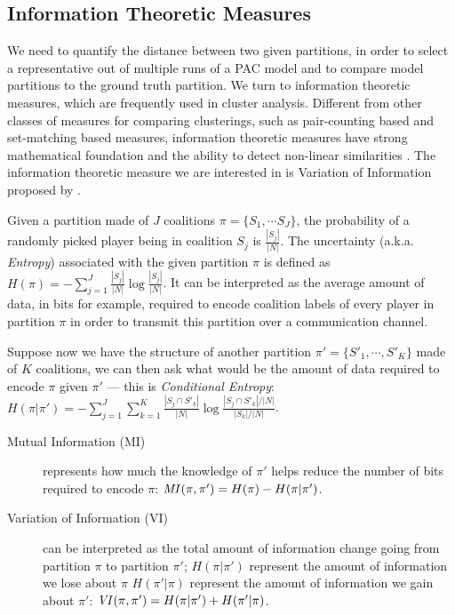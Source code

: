 \subsection{Information Theoretic Measures}
\label{subsec:information_theoretic_measures}

We need to quantify the distance between two given partitions, in order
to select a representative out of multiple runs of a PAC model and to compare
model partitions to the ground truth partition.
We turn to information theoretic measures, which are frequently used in cluster
analysis.
Different from other classes of measures for comparing clusterings, such as
pair-counting based and set-matching based measures, information theoretic
measures have strong mathematical foundation and the ability to detect
non-linear similarities \cite{Vinh:2010:ITM:1756006.1953024}.
The information theoretic measure we are interested in is Variation of
Information proposed by .

Given a partition made of $J$ coalitions $\pi = \{S_1, \cdots S_J\}$, the
probability of a randomly picked player being in coalition $S_j$ is
$\frac{|S_j|}{|N|}$.
The uncertainty (a.k.a. \textit{Entropy}) associated with the given partition
$\pi$ is defined as
$H(\pi) = - \sum^J_{j=1} \frac{|S_j|}{|N|} \log{\frac{|S_j|}{|N|}}$.
It can be interpreted as the average amount of data, in bits for example,
required to encode coalition labels of every player in partition $\pi$ in order
to transmit this partition over a communication channel.

Suppose now we have the structure of another partition
$\pi' = \{S'_1, \cdots, S'_K\}$ made of $K$ coalitions, we can then ask what
would be the amount of data required to encode $\pi$ given $\pi'$
--- this is \textit{Conditional Entropy}:
$H(\pi|\pi') = - \sum^J_{j=1} \sum^K_{k=1} \frac{|S_j \cap S'_k|}{|N|} \log{\frac{|S_j \cap S'_k|/|N|}{|S_k|/|N|}}$.

\begin{description}
    \item[Mutual Information (MI)] represents how much the knowledge of
$\pi'$ helps reduce the number of bits required to encode $\pi$:
$\mathit{MI}(\pi, \pi') = H(\pi) - H(\pi|\pi')$.
    \item[Variation of Information (VI)] can be interpreted as the total
amount of information change going from partition $\pi$ to partition $\pi'$;
$H(\pi|\pi')$ represent the amount of information we lose about $\pi$
$H(\pi'|\pi)$ represent the amount of information we gain about $\pi'$:
$\mathit{VI}(\pi, \pi') = H(\pi|\pi') + H(\pi'|\pi)$.
\end{description}

